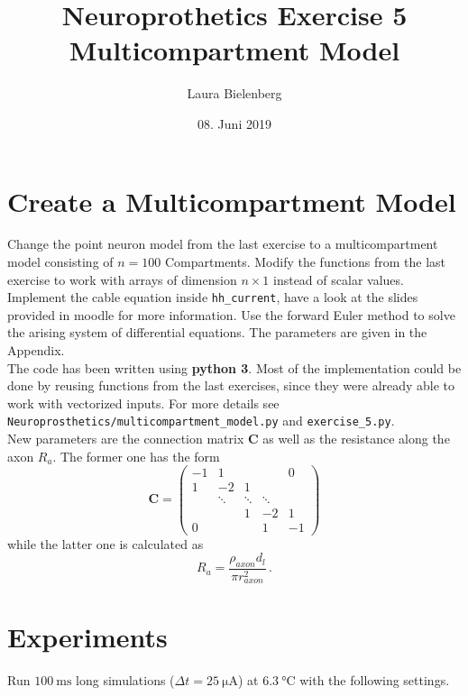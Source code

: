 \documentclass{scrartcl}			%
\title{Neuroprothetics Exercise 5\\Multicompartment Model}
\author{ Laura Bielenberg }
\date{08. Juni 2019}
\begin{document}

\maketitle

\section{Create a Multicompartment Model}

Change the point neuron model from the last exercise to a multicompartment model consisting of $n = 100$ Compartments. Modify the functions from the last exercise to work with arrays of dimension $n × 1$ instead of scalar values. Implement the cable equation inside \texttt{hh\_current}, have a look at the slides provided in moodle for more information. Use the forward Euler method to solve the arising system of differential equations. The parameters are given in the Appendix.\\
\newline
The code has been written using \textbf{python 3}. Most of the implementation could be done by reusing functions from the last exercises, since they were already able to work with vectorized inputs. For more details see \texttt{Neuroprosthetics/multicompartment\_model.py} and \texttt{exercise\_5.py}.\\
\newline
New parameters are the connection matrix $\mathbf{C}$ as well as the resistance along the axon $R_a$. The former one has the form
\begin{equation}
\mathbf{C} = \begin{pmatrix}
	-1& 1 &&&0\\
	1& -2& 1\\
	&\ddots&\ddots&\ddots\\
	&& 1& -2& 1\\
	0&&&1&-1
	\end{pmatrix}
\end{equation}
while the latter one is calculated as
\begin{equation}\label{eqn:ra}
R_a = \frac{\rho_{axon}  d_l}{\pi  r_{axon}^2}\, .
\end{equation}

\newpage
\section{Experiments}
Run $\SI{100}{\milli\second}$ long simulations ($\Delta t = \SI{25}{\micro\ampere}$) at $\SI{6.3}{\celsius}$ with the following settings.
\end{document}
